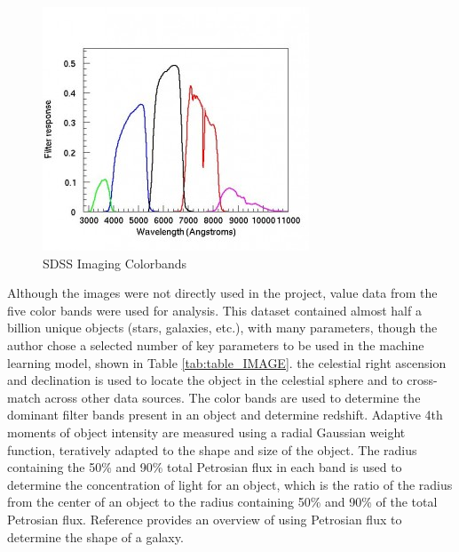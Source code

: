 \documentclass[11pt,sigconf]{acmart}
\begin{document}
\begin{figure}[htbp]
  \centering
  \includegraphics[scale=0.5]{camera_filters-300x274}
  \caption{SDSS Imaging Colorbands \cite{sdss_imaging}}
  \label{fig:colorbands}
\end{figure}


Although the images were not directly used in the project, value data from the five 
color bands were used for analysis. This dataset contained almost half a billion unique 
objects (stars, galaxies, etc.), with many parameters, though the author chose a selected 
number of key parameters to be used in the machine learning model, shown in 
Table \ref{tab:table_IMAGE}. the celestial right ascension and declination is used to 
locate the object in the celestial sphere and to cross-match across other data sources. 
The color bands are used to determine the dominant filter bands present in an object and 
determine redshift. Adaptive 4th moments of object intensity are measured using a radial 
Gaussian weight function, teratively adapted to the shape and size of the object. The 
radius containing the 50\% and 90\% total Petrosian flux in each band is used to 
determine the concentration of light for an object, which is the ratio of the radius 
from the center of an object to the radius containing 50\% and 90\% of the total 
Petrosian flux. Reference \cite{galaxy_photometry} provides an overview of using 
Petrosian flux to determine the shape of a galaxy.
\end{document}
